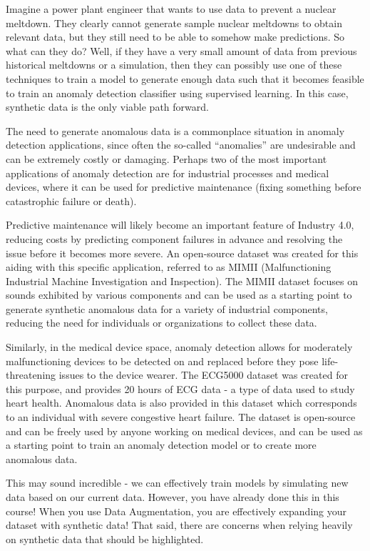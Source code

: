   Imagine a power plant engineer that wants to use data to prevent a nuclear meltdown. They clearly cannot generate sample nuclear meltdowns to obtain relevant data, but they still need to be able to somehow make predictions. So what can they do? Well, if they have a very small amount of data from previous historical meltdowns or a simulation, then they can possibly use one of these techniques to train a model to generate enough data such that it becomes feasible to train an anomaly detection classifier using supervised learning. In this case, synthetic data is the only viable path forward. 
  
  The need to generate anomalous data is a commonplace situation in anomaly detection applications, since often the so-called “anomalies” are undesirable and can be extremely costly or damaging. Perhaps two of the most important applications of anomaly detection are for industrial processes and medical devices, where it can be used for predictive maintenance (fixing something before catastrophic failure or death). 
  
  Predictive maintenance will likely become an important feature of Industry 4.0, reducing costs by predicting component failures in advance and resolving the issue before it becomes more severe. An open-source dataset was created for this aiding with this specific application, referred to as MIMII (Malfunctioning Industrial Machine Investigation and Inspection). The MIMII dataset focuses on sounds exhibited by various components and can be used as a starting point to generate synthetic anomalous data for a variety of industrial components, reducing the need for individuals or organizations to collect these data.
  
  Similarly, in the medical device space, anomaly detection allows for moderately malfunctioning devices to be detected on and replaced before they pose life-threatening issues to the device wearer. The ECG5000 dataset was created for this purpose, and provides 20 hours of ECG data - a type of data used to study heart health. Anomalous data is also provided in this dataset which corresponds to an individual with severe congestive heart failure. The dataset is open-source and can be freely used by anyone working on medical devices, and can be used as a starting point to train an anomaly detection model or to create more anomalous data.   
  
  This may sound incredible - we can effectively train models by simulating new data based on our current data. However, you have already done this in this course! When you use Data Augmentation, you are effectively expanding your dataset with synthetic data! That said, there are concerns when relying heavily on synthetic data that should be highlighted.
  
